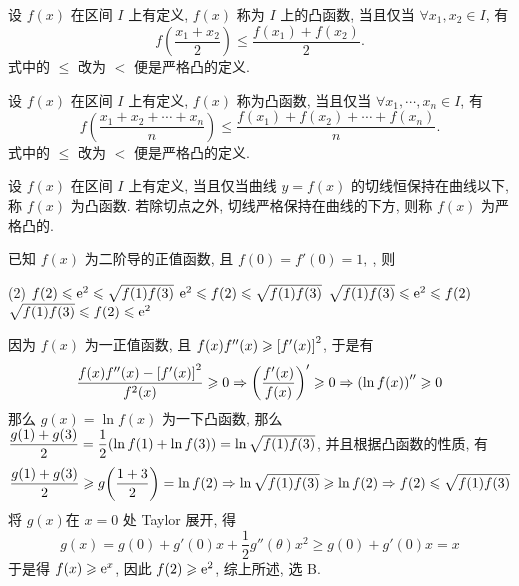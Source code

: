 \begin{definition}[凸函数 B]
    设 $ f(x) $ 在区间 $ I $ 上有定义, $f(x)$ 称为 $ I $ 上的凸函数, 当且仅当 $ \forall x_{1} ,  x_{2} \in I$, 有
    $$f\left(\frac{x_{1}+x_{2}}{2}\right) \leqslant \frac{f\left(x_{1}\right)+f\left(x_{2}\right)}{2} .$$
    式中的 $\leqslant$ 改为 $<$ 便是严格凸的定义.
\end{definition}

\begin{definition}[凸函数 C]
    设 $ f(x) $ 在区间 $ I $ 上有定义, $f(x) $ 称为凸函数, 当且仅当 $ \forall x_{1}, \cdots, x_{n} \in   I$, 有
    $$f\left(\frac{x_{1}+x_{2}+\cdots+x_{n}}{n}\right) \leqslant \frac{f\left(x_{1}\right)+f\left(x_{2}\right)+\cdots+f\left(x_{n}\right)}{n} .$$
    式中的 $\leqslant$ 改为 $<$ 便是严格凸的定义.
\end{definition}

\begin{definition}[凸函数 D]
    设 $ f(x) $ 在区间 $ I $ 上有定义, 当且仅当曲线 $ y=f(x) $ 的切线恒保持在曲线以下, 称 $ f(x) $ 为凸函数. 若除切点之外, 切线严格保持在曲线的下方, 则称 $ f(x) $ 为严格凸的.
\end{definition}

\begin{example}
    已知 $f(x)$ 为二阶导的正值函数, 且 $f(0)=f'(0)=1,~$, 则
    \begin{tasks}(2)
        \task $f(2)\leqslant \mathrm{e}^{2}\leqslant \sqrt{f(1)f(3)}$
        \task $\mathrm{e}^{2}\leqslant f(2)\leqslant \sqrt{f(1)f(3)}$
        \task $\sqrt{f(1)f(3)}\leqslant \mathrm{e}^{2}\leqslant f(2)$
        \task $\sqrt{f(1)f(3)}\leqslant f(2)\leqslant \mathrm{e}^{2}$
    \end{tasks}
\end{example}
\begin{solution}
    因为 $f(x)$ 为一正值函数, 且 $f(x)f''(x)\geqslant \qty[f'(x)]^2$, 于是有 $$\dfrac{f(x)f''(x)-\qty[f'(x)]^2}{f^2(x)}\geqslant 0\Rightarrow \qty(\dfrac{f'(x)}{f(x)})'\geqslant 0\Rightarrow \qty(\ln f(x))''\geqslant 0$$
    那么 $g(x)=\ln f(x)$ 为一下凸函数, 那么 $\dfrac{g(1)+g(3)}{2}=\dfrac{1}{2}\qty(\ln f(1)+\ln f(3))=\ln\sqrt{f(1)f(3)}$, 并且根据凸函数的性质, 有 $$\dfrac{g(1)+g(3)}{2}\geqslant g\qty(\dfrac{1+3}{2})=\ln f(2)\Rightarrow \ln\sqrt{f(1)f(3)}\geqslant \ln f(2)\Rightarrow f(2)\leqslant \sqrt{f(1)f(3)}$$
    将 $g(x)$在 $x=0$ 处 Taylor 展开, 得 $$g(x)=g(0)+g'(0)x+\dfrac{1}{2}g''(\theta)x^2\geqslant g(0)+g'(0)x=x$$
    于是得 $f(x)\geqslant \mathrm{e}^x$, 因此 $f(2)\geqslant \mathrm{e}^2$, 综上所述, 选 B.
\end{solution}

